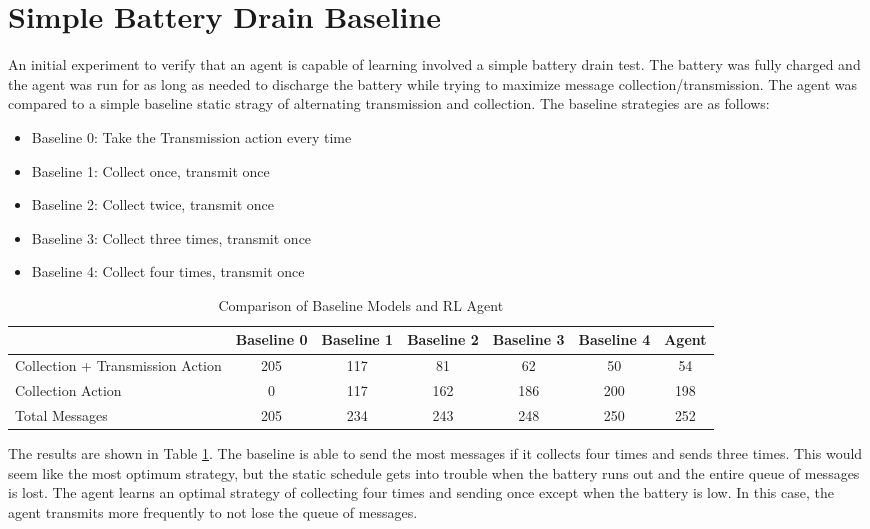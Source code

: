 \documentclass[10pt]{cai}
\begin{document}
\section{Simple Battery Drain Baseline}
An initial experiment to verify that an agent is capable of learning involved a simple battery drain test.
The battery was fully charged and the agent was run for as long as needed to discharge the battery while trying to maximize message collection/transmission.
The agent was compared to a simple baseline static stragy of alternating transmission and collection.
The baseline strategies are as follows:
\begin{itemize}
  \item Baseline 0: Take the Transmission action every time
  \item Baseline 1: Collect once, transmit once
  \item Baseline 2: Collect twice, transmit once
  \item Baseline 3: Collect three times, transmit once
  \item Baseline 4: Collect four times, transmit once
\end{itemize}

\begin{table}[h]
  \centering
  \caption{Comparison of Baseline Models and RL Agent}
  \begin{tabular}{lcccccc}
      \toprule
      & \textbf{Baseline 0} & \textbf{Baseline 1} & \textbf{Baseline 2} & \textbf{Baseline 3} & \textbf{Baseline 4} & \textbf{Agent} \\
      \midrule
      Collection + Transmission Action & 205 & 117 & 81  & 62  & 50  & 54  \\
      Collection Action                 & 0   & 117 & 162 & 186 & 200 & 198 \\
      Total Messages                     & 205 & 234 & 243 & 248 & 250 & 252 \\
      \bottomrule
  \end{tabular}
  \label{tab:batter_drain_result}
\end{table}

The results are shown in Table \ref{tab:batter_drain_result}.
The baseline is able to send the most messages if it collects four times and sends three times.
This would seem like the most optimum strategy, but the static schedule gets into trouble when the battery runs out and the entire queue of messages is lost.
The agent learns an optimal strategy of collecting four times and sending once except when the battery is low.
In this case, the agent transmits more frequently to not lose the queue of messages.


\printbibliography[heading=subbibintoc]
\end{document}
